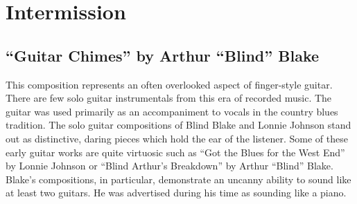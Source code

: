 \documentclass{tufte-handout}
\begin{document}
\section*{Intermission}







\subsection*{``Guitar Chimes'' by Arthur ``Blind'' Blake}
This composition represents an often overlooked aspect of finger-style
guitar. There are few solo guitar instrumentals from this era of
recorded music. The guitar was used primarily as an accompaniment to
vocals in the country blues tradition. The solo guitar compositions of
Blind Blake and Lonnie Johnson stand out as distinctive, daring pieces
which hold the ear of the listener. Some of these early guitar works
are quite virtuosic such as ``Got the Blues for the West End'' by
Lonnie Johnson or ``Blind Arthur's Breakdown'' by Arthur ``Blind''
Blake. Blake's compositions, in particular, demonstrate an uncanny
ability to sound like at least two guitars. He was advertised during
his time as sounding like a piano.
\end{document}

